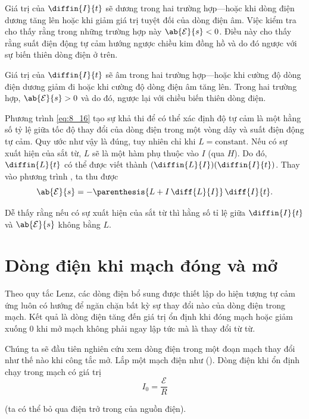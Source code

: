 Giá trị của $\diffin{I}{t}$ sẽ dương trong hai trường hợp---hoặc khi dòng điện dương tăng lên hoặc khi giảm giá trị tuyệt đối của dòng điện âm.
Việc kiểm tra  cho thấy rằng trong những trường hợp này $\ab{\mathcal{E}}{s}<0$.
Điều này cho thấy rằng suất điện động tự cảm hướng ngược chiều kim đồng hồ và do đó ngược với sự biến thiên dòng điện ở trên.

Giá trị của $\diffin{I}{t}$ sẽ âm trong hai trường hợp---hoặc khi cường độ dòng điện dương giảm đi hoặc khi cường độ dòng điện âm tăng lên. Trong hai trường hợp, $\ab{\mathcal{E}}{s}>0$ và do đó, ngược lại với chiều biến thiên dòng điện.

Phương trình \eqref{eq:8_16} tạo sự khả thi để có thể xác định độ tự cảm là một hằng số tỷ lệ giữa tốc độ thay đổi của dòng điện trong một vòng dây và suất điện động tự cảm.
Quy ước như vậy là đúng, tuy nhiên chỉ khi $L=\text{constant}$.
Nếu có sự xuất hiện của sắt từ, $L$ sẽ là một hàm phụ thuộc vào $I$ (qua $H$).
Do đó, $\diffin{L}{t}$ có thể được viết thành $(\diffin{L}{I})(\diffin{I}{t})$.
Thay vào phương trình , ta thu được
\begin{equation}\label{eq:8_17}
	\ab{\mathcal{E}}{s} = - \parenthesis{L + I\, \diff{L}{I}}\, \diff{I}{t}.
\end{equation}

\noindent
Dễ thấy rằng nếu có sự xuất hiện của sắt từ thì hằng số tỉ lệ giữa $\diffin{I}{t}$ và $\ab{\mathcal{E}}{s}$ không bằng $L$.

\section{Dòng điện khi mạch đóng và mở}\label{sec:8_6}

Theo quy tắc Lenz, các dòng điện bổ sung được thiết lập do hiện tượng tự cảm ứng luôn có hướng để ngăn chặn bất kỳ sự thay đổi nào của dòng điện trong mạch.
Kết quả là dòng điện tăng đến giá trị ổn định khi đóng mạch hoặc giảm xuống 0 khi mở mạch không phải ngay lập tức mà là thay đổi từ từ.

Chúng ta sẽ đầu tiên nghiên cứu xem dòng điện trong một đoạn mạch thay đổi như thế nào khi công tắc mở.
Lắp một mạch điện như ().
Dòng điện khi ổn định chạy trong mạch có giá trị
\begin{equation}\label{eq:8_18}
	I_0 = \frac{\mathcal{E}}{R}
\end{equation}

\noindent
(ta có thể bỏ qua điện trở trong của nguồn điện).

